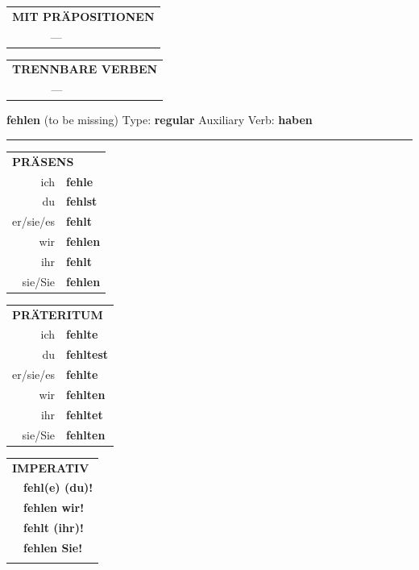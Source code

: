 \documentclass[10pt,a4paper]{revtex4-2}
\begin{document}
\begin{verbbox-acc}
\vspace{10pt}

\begin{tabular}{lll}
\multicolumn{3}{l}{\textbf{MIT PRÄPOSITIONEN}}\\
& ---\\
\end{tabular}
\hfill
\begin{tabular}{lll}
\multicolumn{3}{l}{\textbf{TRENNBARE VERBEN}}\\
& ---\\
\end{tabular}

\vspace{-5pt}
\end{verbbox-acc}

\begin{verbbox}
    {\Large \bf fehlen} (to be missing) \hfill Type: \textbf{regular} \hfill Auxiliary Verb: \textbf{haben} 
    
     \vspace{5pt}

    \hrule
    
    \vspace{5pt}

  \begin{tabular}{rl}
     \multicolumn{2}{l}{\textbf{PRÄSENS} }\\
    ich & \textbf{fehle}\\
    du & \textbf{fehlst}\\
    er/sie/es & \textbf{fehlt}\\
    wir & \textbf{fehlen}\\
    ihr & \textbf{fehlt}\\
    sie/Sie & \textbf{fehlen}\\
  \end{tabular}
  \hfill
     \begin{tabular}{rl}
    \multicolumn{2}{l}{\textbf{PRÄTERITUM} }\\
    ich & \textbf{fehlte}\\
    du & \textbf{fehltest}\\
    er/sie/es & \textbf{fehlte}\\
    wir & \textbf{fehlten}\\
    ihr & \textbf{fehltet}\\
    sie/Sie & \textbf{fehlten}\\
  \end{tabular}
  \hfill
  \begin{tabular}{rl}
     \multicolumn{2}{l}{\textbf{IMPERATIV} }\\
   & \textbf{fehl(e) (du)!}\\
   & \textbf{fehlen wir!}\\
   & \textbf{fehlt (ihr)!}\\
   & \textbf{fehlen Sie!}\\
   & \vspace{10pt}
  \end{tabular}


\end{verbbox}
\end{document}
